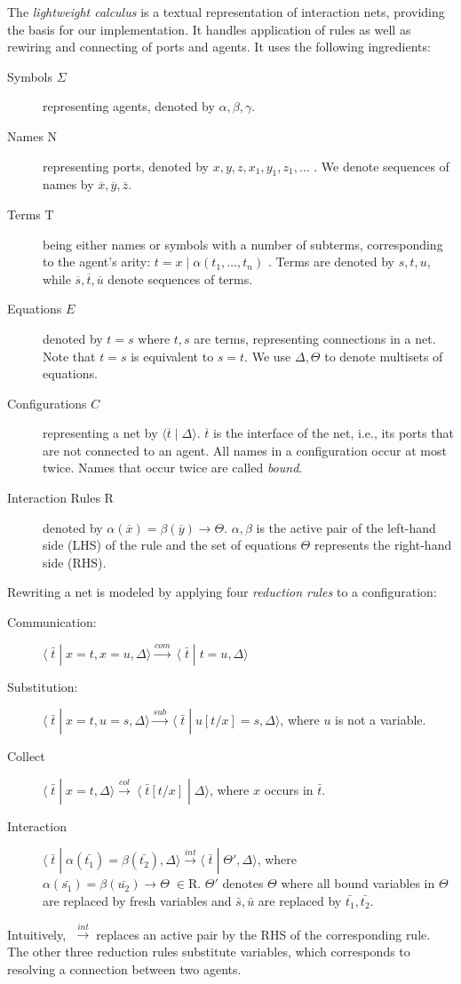 \documentclass[submission,copyright,creativecommons]{eptcs}
\newcommand{\lwint}{$\;\stackrel{int}{\longrightarrow}\;$}
\newcommand{\mlwint}{\stackrel{int}{\longrightarrow}}
\newcommand{\mlwcom}{\stackrel{com}{\longrightarrow}}
\newcommand{\mlwcol}{\stackrel{col}{\longrightarrow}}
\newcommand{\mlwsub}{\stackrel{sub}{\longrightarrow}}
\begin{document}
The \emph{lightweight calculus} \cite{DBLP:journals/eceasst/HassanMS10} is a textual
representation of interaction nets, providing the basis for our
implementation. It handles application of rules as well as rewiring and connecting of ports and
agents. It uses the following ingredients:
\begin{description}
  \item[Symbols $\Sigma$] representing agents, denoted by $\alpha,\beta,\gamma$.
  \item[Names $\mathrm{N}$] representing ports, denoted by
  $x,y,z,x_1,y_1,z_1,\ldots$ . We denote sequences of names by
  $\overline{x},\overline{y},\overline{z}$.
  \item[Terms $\mathrm{T}$]	being either names or symbols with a number of
  subterms, corresponding to the agent's arity: $t = x \; | \; \alpha(t_1,\ldots,t_n)$ .
  Terms are denoted by $s,t,u$, while  $\overline{s},\overline{t},\overline{u}$
  denote sequences of terms.
  \item[Equations $E$] denoted by $t=s$ where $t,s$ are terms, representing
  connections in a net. Note that $t = s$ is equivalent to $s = t$.
  We use $\Delta,\Theta$ to denote multisets of equations.
  \item[Configurations $C$] representing a net by $\langle \overline{t}\;|\; \Delta
  \rangle$. $\overline{t}$ is the interface of the net, i.e., its ports that are not
  connected to an agent. All names in a configuration occur at most twice. Names
  that occur twice are called \emph{bound}.
  \item[Interaction Rules $\mathrm{R}$] denoted by $\alpha(\overline{x}) =
  \beta(\overline{y}) \longrightarrow \Theta$. $\alpha,\beta$ is the active pair of the
  left-hand side (LHS) of the rule and the set of equations $\Theta$ represents
  the right-hand side (RHS).
\end{description}
Rewriting a net is modeled by applying four \emph{reduction rules} to a
configuration:
\begin{description}
  \item[Communication:] $\langle\; \bar{t} \;|\; x=t,x=u,\Delta \rangle
  \mlwcom \ \langle\; \bar{t} \;|\; t=u,\Delta \rangle $
  \item[Substitution:] $\langle\; \bar{t} \;|\; x=t,u=s,\Delta \rangle
  \mlwsub \ \langle\; \bar{t} \;|\; u[t/x]=s,\Delta \rangle $, where
  $u$ is not a variable.
  \item[Collect] $\langle\; \bar{t} \;|\; x=t,\Delta \rangle
  \mlwcol \ \langle\; \bar{t}[t/x] \;|\; \Delta \rangle $, where $x$
  occurs in $\bar{t}$.
  \item[Interaction] $\langle\; \bar{t}  \;|\;  \alpha(\bar{t_1}) =
  \beta(\bar{t_2}),\Delta\rangle \mlwint \langle\; \bar{t} \;|\;
  \Theta',\Delta\rangle$, where $\alpha(\bar{s_1}) =
  \beta(\bar{u_2}) \rightarrow \Theta \; \in \mathrm{R}$. $\Theta'$ denotes
  $\Theta$ where all bound variables in $\Theta$ are replaced by fresh variables
  and $\bar{s},\bar{u}$ are replaced by $\bar{t_1}, \bar{t_2}$.
\end{description}
Intuitively, \lwint replaces an active pair by the RHS of the corresponding
rule. The other three reduction rules substitute variables, which corresponds to
resolving a connection between two agents.
\end{document}
